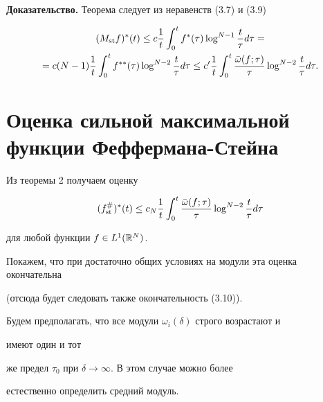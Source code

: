  


{\bf Доказательство.} Теорема следует из неравенств (3.7) и (3.9) 


\begin{gather*} 


(M_{\st} f)^*(t)\le c\frac{1}{t}\int^t_0 f^*(\tau)\log^{N-1} 


\frac{t}{\tau}d\tau =\\ 


% 


=c(N-1)\frac{1}{t}\int^t_0 f^{**}(\tau)\log^{N-2} 


\frac{t}{\tau}d\tau \le c'\frac{1}{t}\int^t_0 


\frac{\Bar\omega(f;\tau)}{\tau}\log^{N-2}\frac{t}{\tau}d\tau. 


\end{gather*} 


 


\section{Оценка сильной максимальной функции Феффермана-Стейна} 


 


Из теоремы 2 получаем оценку 


$$ 


(f_{\st}^\#)^*(t)\le c_N\frac{1}{t}\int^t_0 


\frac{\Bar\omega(f;\tau)}{\tau}\log^{N-2}\frac{t}{\tau}d\tau 


$$ 


для любой функции $f\in L^1(\Bbb R^N)$. 


 


Покажем, что при достаточно общих условиях на модули эта оценка окончательна 


(отсюда будет следовать также окончательность (3.10)). 


 


Будем предполагать, что все модули $\omega_i(\delta)$ строго возрастают и 


имеют один и тот 


же предел $\tau_0$ при $\delta\to\infty$. В этом случае можно более 


естественно определить средний модуль. 


 


